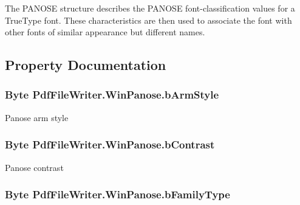 The P\+A\+N\+O\+SE structure describes the P\+A\+N\+O\+SE font-\/classification values for a True\+Type font. These characteristics are then used to associate the font with other fonts of similar appearance but different names. 

\subsection{Property Documentation}
\subsubsection[{\texorpdfstring{b\+Arm\+Style}{bArmStyle}}]{\setlength{\rightskip}{0pt plus 5cm}Byte Pdf\+File\+Writer.\+Win\+Panose.\+b\+Arm\+Style\hspace{0.3cm}{\ttfamily [get]}}\hypertarget{class_pdf_file_writer_1_1_win_panose_a0da5d725fb1445c1fd8b526e980a3e79}{}\label{class_pdf_file_writer_1_1_win_panose_a0da5d725fb1445c1fd8b526e980a3e79}


Panose arm style 

\subsubsection[{\texorpdfstring{b\+Contrast}{bContrast}}]{\setlength{\rightskip}{0pt plus 5cm}Byte Pdf\+File\+Writer.\+Win\+Panose.\+b\+Contrast\hspace{0.3cm}{\ttfamily [get]}}\hypertarget{class_pdf_file_writer_1_1_win_panose_aa973e8c30298b049d131f6a0ede7b542}{}\label{class_pdf_file_writer_1_1_win_panose_aa973e8c30298b049d131f6a0ede7b542}


Panose contrast 

\subsubsection[{\texorpdfstring{b\+Family\+Type}{bFamilyType}}]{\setlength{\rightskip}{0pt plus 5cm}Byte Pdf\+File\+Writer.\+Win\+Panose.\+b\+Family\+Type\hspace{0.3cm}{\ttfamily [get]}}\hypertarget{class_pdf_file_writer_1_1_win_panose_a0207f565adf2e75a73efd666e471e449}{}\label{class_pdf_file_writer_1_1_win_panose_a0207f565adf2e75a73efd666e471e449}



